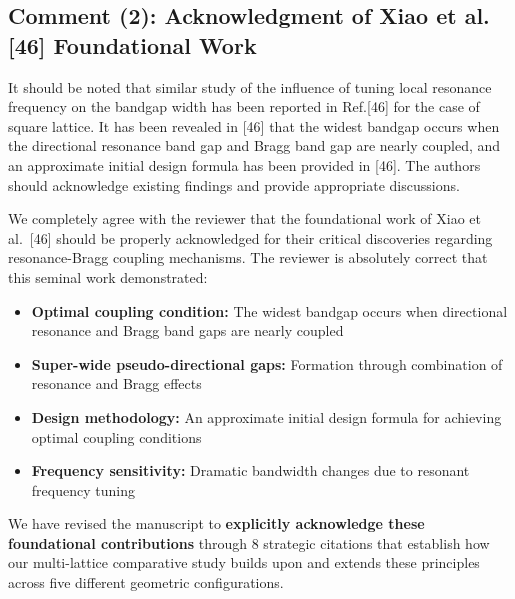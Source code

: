 \documentclass[11pt,a4paper]{article}
\newenvironment{reviewerbox}{%
    \par\medskip\noindent{\color{reviewercolor}\rule{\linewidth}{2pt}}\par
    \noindent{\color{reviewercolor}\bfseries Reviewer Comment}\par\smallskip
}{%
    \par\noindent{\color{reviewercolor}\rule{\linewidth}{0.5pt}}\medskip
}
\newenvironment{responsebox}{%
    \par\medskip\noindent{\color{responsecolor}\rule{\linewidth}{2pt}}\par
    \noindent{\color{responsecolor}\bfseries Response}\par\smallskip
}{%
    \par\noindent{\color{responsecolor}\rule{\linewidth}{0.5pt}}\medskip
}
\begin{document}
\subsection*{Comment (2): Acknowledgment of Xiao et al. [46] Foundational Work}

\begin{reviewerbox}
It should be noted that similar study of the influence of tuning local resonance frequency on the bandgap width has been reported in Ref.[46] for the case of square lattice. It has been revealed in [46] that the widest bandgap occurs when the directional resonance band gap and Bragg band gap are nearly coupled, and an approximate initial design formula has been provided in [46]. The authors should acknowledge existing findings and provide appropriate discussions.
\end{reviewerbox}

\begin{responsebox}
We completely agree with the reviewer that the foundational work of Xiao et al.~[46] should be properly acknowledged for their critical discoveries regarding resonance-Bragg coupling mechanisms. The reviewer is absolutely correct that this seminal work demonstrated:

\begin{itemize}
    \item \textbf{Optimal coupling condition:} The widest bandgap occurs when directional resonance and Bragg band gaps are nearly coupled
    \item \textbf{Super-wide pseudo-directional gaps:} Formation through combination of resonance and Bragg effects
    \item \textbf{Design methodology:} An approximate initial design formula for achieving optimal coupling conditions
    \item \textbf{Frequency sensitivity:} Dramatic bandwidth changes due to resonant frequency tuning
\end{itemize}

We have revised the manuscript to \textbf{explicitly acknowledge these foundational contributions} through 8 strategic citations that establish how our multi-lattice comparative study builds upon and extends these principles across five different geometric configurations.
\end{responsebox}
\end{document}

